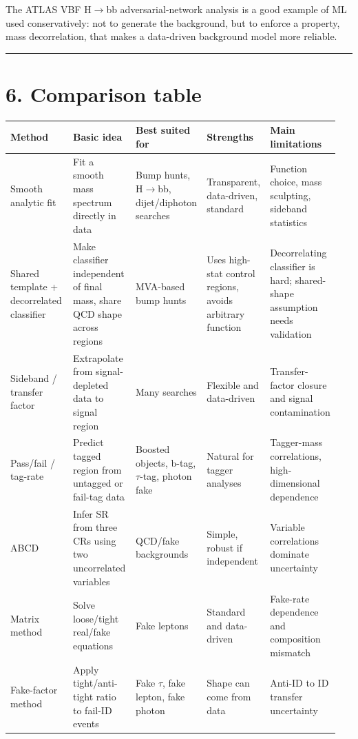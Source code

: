 \documentclass[11pt]{article}
\begin{document}
The ATLAS VBF H$\to$bb adversarial-network analysis is a good example of ML used conservatively: not to generate the background, but to enforce a property, mass decorrelation, that makes a data-driven background model more reliable.

\bigskip\hrule\bigskip

\section{6. Comparison table}

\begin{center}\small\begin{longtable}{|p{0.19\linewidth}|p{0.19\linewidth}|p{0.19\linewidth}|p{0.19\linewidth}|p{0.19\linewidth}|}\hline
Method & Basic idea & Best suited for & Strengths & Main limitations \\ \hline
Smooth analytic fit & Fit a smooth mass spectrum directly in data & Bump hunts, H$\to$bb, dijet/diphoton searches & Transparent, data-driven, standard & Function choice, mass sculpting, sideband statistics \\ \hline
Shared template + decorrelated classifier & Make classifier independent of final mass, share QCD shape across regions & MVA-based bump hunts & Uses high-stat control regions, avoids arbitrary function & Decorrelating classifier is hard; shared-shape assumption needs validation \\ \hline
Sideband / transfer factor & Extrapolate from signal-depleted data to signal region & Many searches & Flexible and data-driven & Transfer-factor closure and signal contamination \\ \hline
Pass/fail / tag-rate & Predict tagged region from untagged or fail-tag data & Boosted objects, b-tag, $\tau$-tag, photon fake & Natural for tagger analyses & Tagger-mass correlations, high-dimensional dependence \\ \hline
ABCD & Infer SR from three CRs using two uncorrelated variables & QCD/fake backgrounds & Simple, robust if independent & Variable correlations dominate uncertainty \\ \hline
Matrix method & Solve loose/tight real/fake equations & Fake leptons & Standard and data-driven & Fake-rate dependence and composition mismatch \\ \hline
Fake-factor method & Apply tight/anti-tight ratio to fail-ID events & Fake $\tau$, fake lepton, fake photon & Shape can come from data & Anti-ID to ID transfer uncertainty \\ \hline

\end{longtable}
\end{center}
\end{document}
